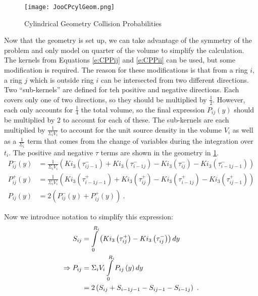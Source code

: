 \begin{figure}[h]
  \centering
  \texttt{[image: JooCPcylGeom.png]}
  \caption[Cylindrical Geometry Collision Probabilities]{Cylindrical Geometry Collision Probabilities}\label{f:CPcylGeom}
\end{figure}

Now that the geometry is set up, we can take advantage of the symmetry of the problem and only model on quarter of the volume to simplify the calculation.  The kernels from Equations \ref{e:CPPij} and \ref{e:CPPii} can be used, but some modification is required.  The reason for these modifications is that from a ring $i$, a ring $j$ which is outside ring $i$ can be intersected from two different directions.  Two ``sub-kernels'' are defined for teh positive and negative directions.  Each covers only one of two directions, so they should be multiplied by $\frac{1}{2}$.  However, each only accounts for $\frac{1}{4}$ the total volume, so the final expression $P_{ij}\left(y\right)$ should be multiplied by 2 to account for each of these.  The sub-kernels are each multiplied by $\frac{1}{\Sigma_i V_i}$ to account for the unit source density in the volume $V_i$ as well as a $\frac{1}{\Sigma_i}$ term that comes from the change of variables during the integration over $t_i$.  The positive and negative $\tau$ terms are shown in the geometry in \ref{f:CPcylGeom}.
\begin{subequations}\label{e:CPcylPij(y)}
  \begin{align}
  P_{ij}^-\left(y\right) &= \frac{1}{\Sigma_i V_i} \left(Ki_3\left(\tau_{ij-1}^-\right) + Ki_3\left(\tau_{i-1j}^-\right) - Ki_3\left(\tau_{ij}^-\right) - Ki_3\left(\tau_{i-1j-1}^-\right)\right) \\
  P_{ij}^+\left(y\right) &= \frac{1}{\Sigma_i V_i} \left(Ki_3\left(\tau_{i-1j-1}^+\right) + Ki_3\left(\tau_{ij}^+\right) - Ki_3\left(\tau_{i-1j}^+\right) - Ki_3\left(\tau_{ij-1}^+\right)\right) \\
  P_{ij}\left(y\right) &= 2\left(P_{ij}^-\left(y\right) + P_{ij}^+\left(y\right)\right)\ .
  \end{align}
\end{subequations}

Now we introduce notation to simplify this expression:
\begin{subequations}\label{e:CPcypPij}
  \begin{align}
  S_{ij} &= \intop_0^{R_i} \left(Ki_3\left(\tau_{ij}^+\right) - Ki_3\left(\tau_{ij}^-\right)\right)dy \\
  \Rightarrow P_{ij} &= \Sigma_i V_i \intop_0^{R_i} P_{ij}\left(y\right)dy \nonumber \\
  &= 2\left(S_{ij} + S_{i-1j-1} - S_{ij-1} - S_{i-1j}\right)\ .
  \end{align}
\end{subequations}

